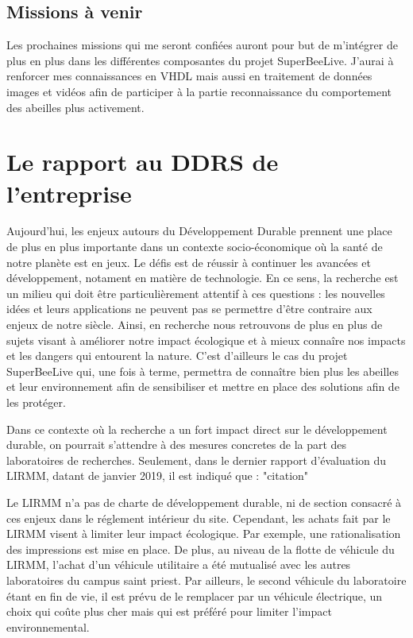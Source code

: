 \documentclass[11pt,french,a4paper]{report}
\begin{document}
\section{Missions à venir}
Les prochaines missions qui me seront confiées auront pour but de m'intégrer de plus en plus dans les différentes composantes du projet
SuperBeeLive. J'aurai à renforcer mes connaissances en VHDL mais aussi en traitement de données images et vidéos afin de participer à 
la partie reconnaissance du comportement des abeilles plus activement. 

\chapter{Le rapport au DDRS de l'entreprise}
Aujourd'hui, les enjeux autours du Développement Durable prennent une place
de plus en plus importante dans un contexte socio-économique où la santé de notre
planète est en jeux. Le défis est de réussir à continuer les avancées et développement, 
notament en matière de technologie. En ce sens, la recherche est un milieu qui doit être 
particulièrement attentif à ces questions : les nouvelles idées et leurs applications ne 
peuvent pas se permettre d'être contraire aux enjeux de notre siècle.
Ainsi, en recherche nous retrouvons de plus en plus de sujets visant à améliorer notre impact 
écologique et à mieux connaîre nos impacts et les dangers qui entourent la nature. 
C'est d'ailleurs le cas du projet SuperBeeLive qui, une fois à terme, permettra de connaître 
bien plus les abeilles et leur environnement afin de sensibiliser et mettre en place des solutions afin de les 
protéger.

Dans ce contexte où la recherche a un fort impact direct sur le développement durable, on pourrait 
s'attendre à des mesures concretes de la part des laboratoires de recherches. Seulement, dans le dernier
rapport d'évaluation du LIRMM, datant de janvier 2019, il est indiqué que :
"citation" 


Le LIRMM n'a pas de charte de développement durable, ni de section consacré à ces enjeux dans le réglement intérieur du site. Cependant, 
les achats fait par le LIRMM visent à limiter leur impact écologique. Par exemple, une rationalisation des impressions est mise en place. 
De plus, au niveau de la flotte de véhicule du LIRMM, l'achat d'un véhicule utilitaire a été mutualisé avec les autres laboratoires du campus 
saint priest. Par ailleurs, le second véhicule du laboratoire étant en fin de vie, il est prévu de le remplacer par un véhicule électrique, 
un choix qui coûte plus cher mais qui est préféré pour limiter l'impact environnemental.
\end{document}
